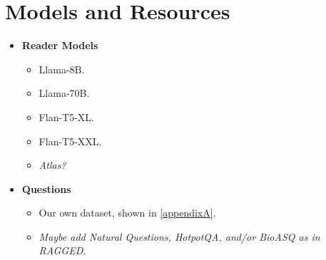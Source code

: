 \section{Models and Resources}
\label{models_and_resources}

\begin{itemize}
	\item \textbf{Reader Models}
		\begin{itemize}
			\item Llama-8B.
			\item Llama-70B.
			\item Flan-T5-XL.
			\item Flan-T5-XXL.
			\item \textsl{Atlas?}
		\end{itemize}
	\item \textbf{Questions}
		\begin{itemize}
			\item Our own dataset, shown in \cref{appendixA}.
			\item \textsl{Maybe add \textsf{Natural Questions}, \textsf{HotpotQA}, and/or \textsf{BioASQ} as in \textup{\textsf{RAGGED}\cite{ragged}}}.
		\end{itemize}
\end{itemize}
